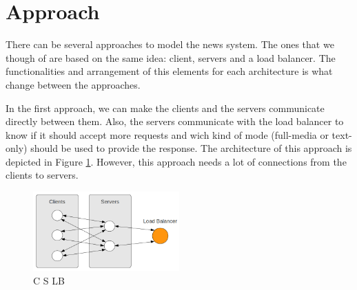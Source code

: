 \documentclass[a4paper]{article}
\begin{document}

%
%
\section{Approach}

There can be several approaches to model the news system. The ones that we
though of are based on the same idea: client, servers and a load balancer. The
functionalities and arrangement of this elements for each architecture is what
change between the approaches.

In the first approach, we can make the clients and the servers communicate
directly between them. Also, the servers communicate with the load balancer to
know if it should accept more requests and wich kind of mode (full-media or
text-only) should be used to provide the response. The architecture of this
approach is depicted in Figure \ref{fig:cslb}. However, this approach needs
a lot of connections from the clients to servers.

\begin{figure}[htb]
	\begin{center}
		\includegraphics[width=0.5\textwidth]{images/c_s_lb.png}
	\end{center}
	\caption{C S LB}
	\label{fig:cslb}
\end{figure}
\end{document}
